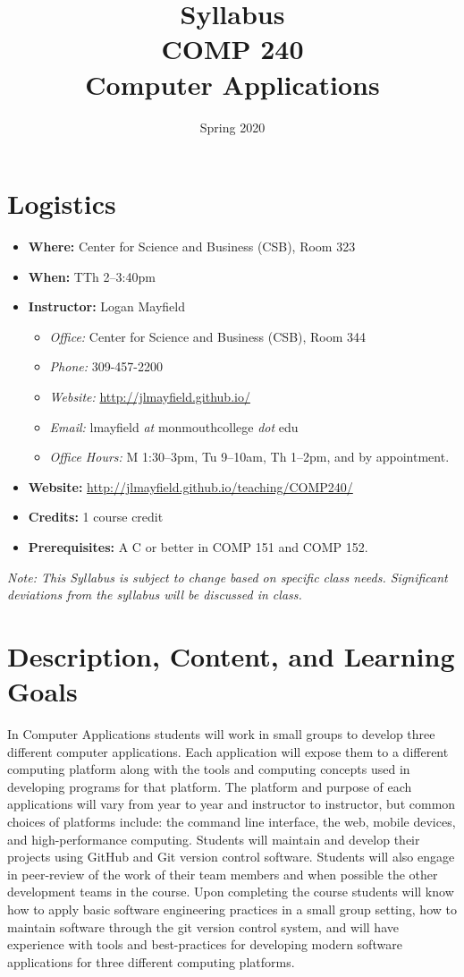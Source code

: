 \documentclass[10pt]{article}
\title{Syllabus \\ COMP 240 \\ Computer Applications}
\author{  }
\date{Spring 2020}
\begin{document}
\maketitle

\section{Logistics}
\begin{itemize}
\item \textbf{Where: } Center for Science and Business (CSB), Room 323
\item \textbf{When: } TTh 2--3:40pm
\item \textbf{Instructor: } Logan Mayfield
\begin{itemize}
\item \textit{Office: } Center for Science and Business (CSB), Room 344
\item \textit{Phone: } 309-457-2200 %
\item \textit{Website: } \url{http://jlmayfield.github.io/}
\item \textit{Email: } lmayfield \textit{at} monmouthcollege \textit{dot} edu
\item \textit{Office Hours: }  M 1:30--3pm, Tu 9--10am, Th 1--2pm, and by appointment.
\end{itemize}
\item \textbf{Website: } \url{http://jlmayfield.github.io/teaching/COMP240/}
\item \textbf{Credits: } 1 course credit
\item \textbf{Prerequisites: } A C or better in COMP 151 and COMP 152.
\end{itemize}
\emph{Note: This Syllabus is subject to change based on specific class needs. Significant deviations from the syllabus will be discussed in class.}

\section{Description, Content, and Learning Goals}

In Computer Applications students will work in small groups to develop three different computer applications.  Each application will expose them to a different computing platform along with the tools and computing concepts used in developing programs for that platform. The platform and purpose of each applications will vary from year to year and instructor to instructor, but common choices of platforms include: the command line interface, the web, mobile devices, and high-performance computing. Students will maintain and develop their projects using GitHub and Git version control software. Students will also engage in peer-review of the work of their team members and when possible the other development teams in the course. Upon completing the course students will know how to apply basic software engineering practices in a small group setting, how to maintain software through the git version control system, and will have experience with tools and best-practices for developing modern software applications for three different computing platforms.
\end{document}
